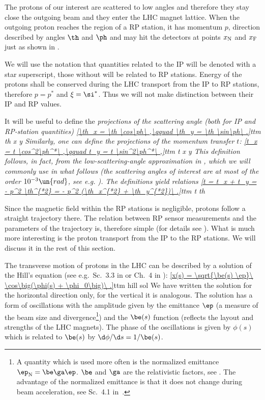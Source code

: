 The protons of our interest are scattered to low angles and therefore they stay close the outgoing beam and they enter the LHC magnet lattice. When the outgoing proton reaches the region of a RP station, it has momentum $p$, direction described by angles $\th$ and $\ph$ and may hit the detectors at points $x_{\rm N}$ and $x_{\rm F}$ just as shown in .

We will use the notation that quantities related to the IP will be denoted with a star superscript, those without will be related to RP stations. Energy of the protons shall be conserved during the LHC transport from the IP to RP stations, therefore $p = p^*$ and $\xi = \si^*$. Thus we will not make distinction between their IP and RP values.

It will be useful to define the \em{projections of the scattering angle} (both for IP and RP-station quantities)
\eqref{\th_x = \th \cos\ph\ ,\qquad \th_y = \th \sin\ph\ .}{ttm th x y}
Similarly, one can define the projections of the momentum transfer $t$:
\eqref{t_x = t \cos^2\ph^*\ ,\qquad t_y = t \sin^2\ph^*\ ,}{ttm t x y}
This definition follows, in fact, from the low-scattering-angle approximation in , which we will commonly use in what follows (the scattering angles of interest are at most of the order $10^{-3}\un{rad}$, see e.g. ). The definitions  yield relations
\eqref{t = t_x + t_y = - p^2 \th^{*2} = - p^2 (\th_x^{*2} + \th_y^{*2})\ .}{ttm t th}

Since the magnetic field within the RP stations is negligible, protons follow a straight trajectory there. The relation between RP sensor measurements and the parameters of the trajectory is, therefore simple (for details see ). What is much more interesting is the proton transport from the IP to the RP stations. We will discuss it in the rest of this section.

The transverse motion of protons in the LHC can be described by a solution of the Hill's equation (see e.g.~Sc.~3.3 in  or Ch.~4 in ):
\eqref{x(s) = \sqrt{\be(s) \ep}\ \cos\big(\phi(s) + \phi_0\big)\ .}{ttm hill sol}
We have written the solution for the horizontal direction only, for the vertical it is analogous. The solution has a form of oscillations with the amplitude given by the emittance $\ep$ (a measure of the beam size and divergence\footnote{%
A quantity which is used more often is the normalized emittance $\ep_{\rm N} = \be\ga \ep$. $\be$ and $\ga$ are the relativistic factors, see . The advantage of the normalized emittance is that it does not change during beam acceleration, see Sc.~4.1 in~.
}) and the $\be(s)$ function (reflects the layout and strengths of the LHC magnets). The phase of the oscillations is given by $\phi(s)$ which is related to $\be(s)$ by $\d\phi/\d s = 1/\be(s)$.


